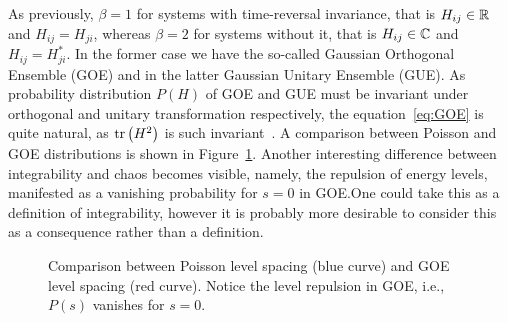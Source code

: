 As previously, \(\beta = 1\) for systems with time-reversal invariance, that is
\(H_{ij}\in \mathbb{R}{}\) and \(H_{ij} = H_{ji}\), whereas \(\beta = 2\) for systems without it,
that is \(H_{ij} \in \mathbb{C}{}\) and \(H_{ij} = H_{ji}^{\ast}\). In the former case we have
the so-called Gaussian Orthogonal Ensemble (GOE) and in the latter Gaussian Unitary Ensemble (GUE).
As probability distribution \(P(H)\) of GOE and GUE must be invariant under orthogonal and unitary transformation
respectively, the equation~\eqref{eq:GOE} is quite natural, as \(\tr\left(H^2\right)\) is such
invariant~\autocite{DAlessio2016}. A comparison between Poisson and GOE distributions
is shown in Figure~\ref{fig:spacing}. Another interesting difference between integrability and
chaos becomes visible, namely, the repulsion of energy levels, manifested as a vanishing probability
for \(s=0\) in GOE.\@ One could take this as a definition of integrability, however it is probably
more desirable to consider this as a consequence rather than a definition.

\begin{figure}[htbp]
    \centering
    \caption{Comparison between Poisson level spacing (blue curve) and GOE level spacing (red curve).
    Notice the level repulsion in GOE, i.e., \(P(s)\) vanishes for \(s = 0\).}
    \label{fig:spacing}
  \end{figure}
  


